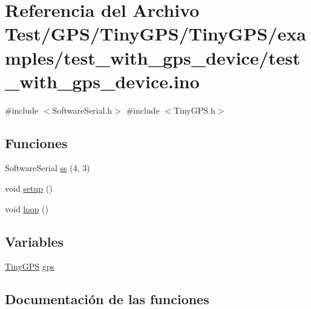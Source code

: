 \hypertarget{test__with__gps__device_8ino}{}\section{Referencia del Archivo Test/\+G\+P\+S/\+Tiny\+G\+P\+S/\+Tiny\+G\+P\+S/examples/test\+\_\+with\+\_\+gps\+\_\+device/test\+\_\+with\+\_\+gps\+\_\+device.ino}
\label{test__with__gps__device_8ino}
{\ttfamily \#include $<$Software\+Serial.\+h$>$}\newline
{\ttfamily \#include $<$Tiny\+G\+P\+S.\+h$>$}\newline
\subsection*{Funciones}
\begin{DoxyCompactItemize}
\item 
Software\+Serial \hyperlink{test__with__gps__device_8ino_ad6146be3f2c4ff5ac64c90ef5d1b37b1}{ss} (4, 3)
\item 
void \hyperlink{test__with__gps__device_8ino_a4fc01d736fe50cf5b977f755b675f11d}{setup} ()
\item 
void \hyperlink{test__with__gps__device_8ino_afe461d27b9c48d5921c00d521181f12f}{loop} ()
\end{DoxyCompactItemize}
\subsection*{Variables}
\begin{DoxyCompactItemize}
\item 
\hyperlink{class_tiny_g_p_s}{Tiny\+G\+PS} \hyperlink{test__with__gps__device_8ino_a4e2f9a5d1b23f30f530101af71f72744}{gps}
\end{DoxyCompactItemize}


\subsection{Documentación de las funciones}
\mbox{\label{test__with__gps__device_8ino_afe461d27b9c48d5921c00d521181f12f}} 
